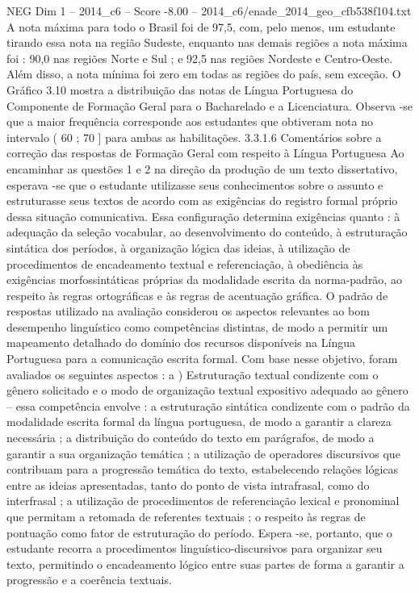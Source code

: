 \begin{textsample}{NEG Dim 1 – 2014\_c6 – Score -8.00 – 2014\_c6/enade\_2014\_geo\_cfb538f104.txt}
A nota máxima para todo o Brasil foi de 97,5, com, pelo menos, um estudante tirando essa nota na região Sudeste, enquanto nas demais regiões a nota máxima foi : 90,0 nas regiões Norte e Sul ; e 92,5 nas regiões Nordeste e Centro-Oeste.
Além disso, a nota mínima foi zero em todas as regiões do país, sem exceção.
O Gráfico 3.10 mostra a distribuição das notas de Língua Portuguesa do Componente de Formação Geral para o Bacharelado e a Licenciatura.
Observa -se que a maior frequência corresponde aos estudantes que obtiveram nota no intervalo ( 60 ; 70 ] para ambas as habilitações. 3.3.1.6 Comentários sobre a correção das respostas de Formação Geral com respeito à Língua Portuguesa Ao encaminhar as questões 1 e 2 na direção da produção de um texto dissertativo, esperava -se que o estudante utilizasse seus conhecimentos sobre o assunto e estruturasse seus textos de acordo com as exigências do registro formal próprio dessa situação comunicativa.
Essa configuração determina exigências quanto : à adequação da seleção vocabular, ao desenvolvimento do conteúdo, à estruturação sintática dos períodos, à organização lógica das ideias, à utilização de procedimentos de encadeamento textual e referenciação, à obediência às exigências morfossintáticas próprias da modalidade escrita da norma-padrão, ao respeito às regras ortográficas e às regras de acentuação gráfica.
O padrão de respostas utilizado na avaliação considerou os aspectos relevantes ao bom desempenho linguístico como competências distintas, de modo a permitir um mapeamento detalhado do domínio dos recursos disponíveis na Língua Portuguesa para a comunicação escrita formal.
Com base nesse objetivo, foram avaliados os seguintes aspectos : a ) Estruturação textual condizente com o gênero solicitado e o modo de organização textual expositivo adequado ao gênero – essa competência envolve : a estruturação sintática condizente com o padrão da modalidade escrita formal da língua portuguesa, de modo a garantir a clareza necessária ; a distribuição do conteúdo do texto em parágrafos, de modo a garantir a sua organização temática ; a utilização de operadores discursivos que contribuam para a progressão temática do texto, estabelecendo relações lógicas entre as ideias apresentadas, tanto do ponto de vista intrafrasal, como do interfrasal ; a utilização de procedimentos de referenciação lexical e pronominal que permitam a retomada de referentes textuais ; o respeito às regras de pontuação como fator de estruturação do período.
Espera -se, portanto, que o estudante recorra a procedimentos linguístico-discursivos para organizar seu texto, permitindo o encadeamento lógico entre suas partes de forma a garantir a progressão e a coerência textuais.

\end{textsample}
